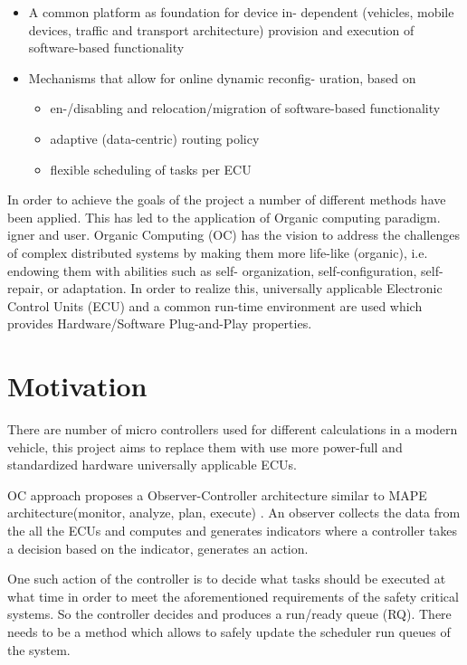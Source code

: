 \begin{itemize}
\item A common platform as foundation for device in-
dependent (vehicles, mobile devices, traffic and
transport architecture) provision and execution of
software-based functionality
\item Mechanisms that allow for online dynamic reconfig-
uration, based on
\begin{itemize}
\item en-/disabling and relocation/migration of
software-based functionality
\item adaptive (data-centric) routing policy
\item flexible scheduling of tasks per ECU
\end{itemize}
\end{itemize}

In order to achieve the goals of the project a number of different methods have been applied. This has led to the application of Organic computing paradigm. igner and user.
Organic Computing (OC) has the vision to address the
challenges of complex distributed systems by making them more
life-like (organic), i.e. endowing them with abilities such as self-
organization, self-configuration, self-repair, or adaptation.
In order to realize this, universally applicable Electronic Control Units (ECU) and a common run-time environment are used which provides Hardware/Software Plug-and-Play properties.

\section{Motivation}

There are number of micro controllers used for different calculations in a modern vehicle, this project aims to replace them with use more power-full and standardized hardware universally applicable ECUs. 

OC approach proposes a Observer-Controller architecture similar to MAPE architecture(monitor, analyze, plan, execute) . An observer collects the data from the all the ECUs and computes and generates indicators where a controller takes a decision based on the indicator, generates an action.

One such action of the controller is to decide what tasks should be executed at what time in order to meet the aforementioned requirements of the safety critical systems. So the controller decides and produces a run/ready queue (RQ). There needs to be a method which allows to safely update the scheduler run queues of the system. 


